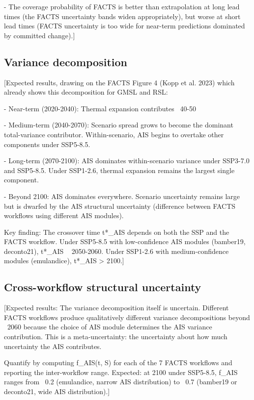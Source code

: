\documentclass[11pt]{article}
\begin{document}
- The coverage probability of FACTS is better than extrapolation at long lead times (the FACTS uncertainty bands widen appropriately), but worse at short lead times (FACTS uncertainty is too wide for near-term predictions dominated by committed change).]

\subsection{Variance decomposition}
\label{sec:variance}

[Expected results, drawing on the FACTS Figure 4 (Kopp et al. 2023) which already shows this decomposition for GMSL and RSL:

- Near-term (2020-2040): Thermal expansion contributes ~40-50%

- Medium-term (2040-2070): Scenario spread grows to become the dominant total-variance contributor. Within-scenario, AIS begins to overtake other components under SSP5-8.5.

- Long-term (2070-2100): AIS dominates within-scenario variance under SSP3-7.0 and SSP5-8.5. Under SSP1-2.6, thermal expansion remains the largest single component.

- Beyond 2100: AIS dominates everywhere. Scenario uncertainty remains large but is dwarfed by the AIS structural uncertainty (difference between FACTS workflows using different AIS modules).

Key finding: The crossover time t*_AIS depends on both the SSP and the FACTS workflow. Under SSP5-8.5 with low-confidence AIS modules (bamber19, deconto21), t*_AIS ~ 2050-2060. Under SSP1-2.6 with medium-confidence modules (emulandice), t*_AIS > 2100.]

\subsection{Cross-workflow structural uncertainty}
\label{sec:structural}

[Expected results: The variance decomposition itself is uncertain. Different FACTS workflows produce qualitatively different variance decompositions beyond ~2060 because the choice of AIS module determines the AIS variance contribution. This is a meta-uncertainty: the uncertainty about how much uncertainty the AIS contributes.

Quantify by computing f_AIS(t, S) for each of the 7 FACTS workflows and reporting the inter-workflow range. Expected: at 2100 under SSP5-8.5, f_AIS ranges from ~0.2 (emulandice, narrow AIS distribution) to ~0.7 (bamber19 or deconto21, wide AIS distribution).]
\end{document}
